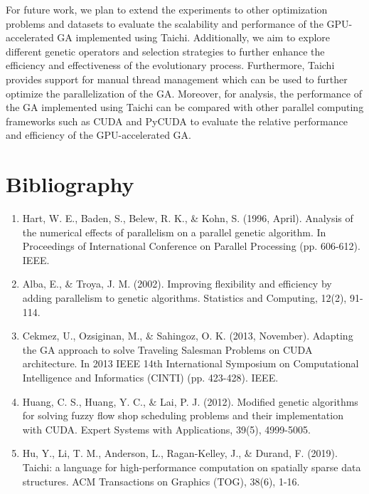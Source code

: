 \documentclass[conference]{IEEEtran}
\begin{document}
For future work, we plan to extend the experiments to other optimization
problems and datasets to evaluate the scalability and performance of the
GPU-accelerated GA implemented using Taichi. Additionally, we aim to explore
different genetic operators and selection strategies to further enhance the
efficiency and effectiveness of the evolutionary process. Furthermore, Taichi
provides support for manual thread management which can be used to further
optimize the parallelization of the GA. Moreover, for analysis, the performance
of the GA implemented using Taichi can be compared with other parallel
computing frameworks such as CUDA and PyCUDA to evaluate the relative
performance and efficiency of the GPU-accelerated GA. \section*{Bibliography}

\begin{enumerate}
    \item Hart, W. E., Baden, S., Belew, R. K., \& Kohn, S. (1996, April). Analysis of
          the numerical effects of parallelism on a parallel genetic algorithm. In
          Proceedings of International Conference on Parallel Processing (pp. 606-612).
          IEEE.
    \item Alba, E., \& Troya, J. M. (2002). Improving flexibility and efficiency by
          adding parallelism to genetic algorithms. Statistics and Computing, 12(2),
          91-114.
    \item Cekmez, U., Ozsiginan, M., \& Sahingoz, O. K. (2013, November). Adapting the GA
          approach to solve Traveling Salesman Problems on CUDA architecture. In 2013
          IEEE 14th International Symposium on Computational Intelligence and Informatics
          (CINTI) (pp. 423-428). IEEE.
    \item Huang, C. S., Huang, Y. C., \& Lai, P. J. (2012). Modified genetic algorithms
          for solving fuzzy flow shop scheduling problems and their implementation with
          CUDA. Expert Systems with Applications, 39(5), 4999-5005.
    \item Hu, Y., Li, T. M., Anderson, L., Ragan-Kelley, J., \& Durand, F. (2019).
          Taichi: a language for high-performance computation on spatially sparse data
          structures. ACM Transactions on Graphics (TOG), 38(6), 1-16.
\end{enumerate}
\end{document}
